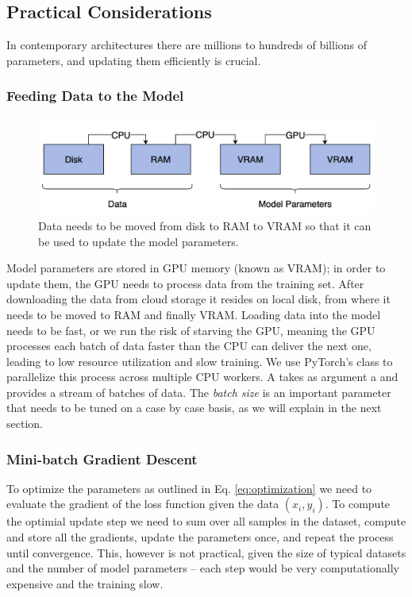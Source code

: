 \subsection{Practical Considerations}
In contemporary architectures there are millions to hundreds of billions of parameters, and updating them efficiently is crucial.

\subsubsection*{Feeding Data to the Model}
\begin{figure}[h]
    \includegraphics[width=\linewidth]{chapters/NLP/figures/ram_cpu_vram.png}
    \caption{Data needs to be moved from disk to RAM to VRAM so that it can be used to update the model parameters.}
    \label{fig:ram_cpu_vram}
\end{figure}
Model parameters are stored in GPU memory (known as VRAM); in order to update them, the GPU needs to process data from the training set.
After downloading the data from cloud storage it resides on local disk, from where it needs to be moved to RAM and finally VRAM.
Loading data into the model needs to be fast, or we run the risk of starving the GPU, meaning the GPU processes each batch of data faster than the CPU can deliver the next one, leading to low resource utilization and slow training.
We use PyTorch's  class to parallelize this process across multiple CPU workers.
A  takes as argument a  and provides a stream of batches of data.
The \textit{batch size} is an important parameter that needs to be tuned on a case by case basis, as we will explain in the next section.


\subsubsection*{Mini-batch Gradient Descent}
To optimize the parameters as outlined in Eq. \ref{eq:optimization} we need to evaluate the gradient of the loss function given the data $(x_i, y_i)$.
To compute the optimial update step we need to sum over all samples in the dataset, compute and store all the gradients, update the parameters once, and repeat the process until convergence.
This, however is not practical, given the size of typical datasets and the number of model parameters -- each step would be very computationally expensive and the training slow.


